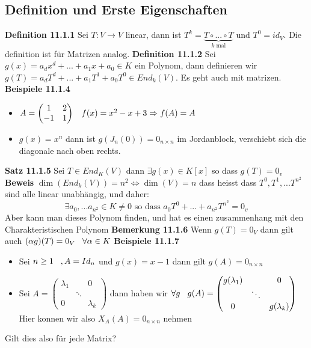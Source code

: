 \documentclass{article}
\newcommand{\smspc}{\hspace{0.3cm}}
\begin{document}
\subsection{Definition und Erste Eigenschaften}\textbf{Definition 11.1.1} Sei $T:V\rightarrow V$ linear, dann ist $T^k=\underset{k\text{ mal}}{\underbrace{T\circ...\circ T}}$ und $T^0=id_V$. Die definition ist für Matrizen analog.\newline
\textbf{Definition 11.1.2} Sei $g(x)=a_dx^d+...+a_1x+a_0\in K$ ein Polynom, dann definieren wir $g(T)=a_dT^d+...+a_1T^1+a_0T^0\in End_k(V)$. Es geht auch mit matrizen.
\newline\textbf{Beispiele 11.1.4}
\begin{itemize}
  \item{$A=\begin{pmatrix}1&2\\-1&1\end{pmatrix}\smspc f(x)=x^2-x+3\Rightarrow f(A)=A$}
  \item{$g(x)=x^n$ dann ist $g(J_n(0))=0_{n\times n}$ im Jordanblock, verschiebt sich die diagonale nach oben rechts.}
\end{itemize}
\textbf{Satz 11.1.5} Sei $T\in End_K(V)$ dann $\exists g(x)\in K[x]$ so dass $g(T)=0_v$
\newline\textbf{Beweis} $\dim(End_k(V))=n^2\Leftrightarrow\dim(V)=n$ dass heisst dass $T^0,T^1,...T^{n^2}$ sind alle linear unabhängig, und daher:\[\exists a_0,...a_{n^2}\in K \neq 0\text{ so dass }a_0T^0+...+a_{n^2}T^{n^2}=0_v\]
\newline Aber kann man dieses Polynom finden, und hat es einen zusammenhang mit den Charakteristischen Polynom\newline
\textbf{Bemerkung 11.1.6} Wenn $g(T)=0_V$ dann gilt auch $(\alpha g)(T)=0_V\smspc \forall \alpha \in K$
\newline\textbf{Beispiele 11.1.7}\begin{itemize}
  \item{Sei $n\ge1\smspc, A=Id_n$ und $g(x)=x-1$ dann gilt $g(A)=0_{n\times n}$}
  \item{Sei $A=\begin{pmatrix}\lambda_1&\left.\right.&0\\\left.\right.&\ddots&\left.\right.\\0&\left.\right.&\lambda_k\end{pmatrix}$ dann haben wir
    $\forall g\smspc g(A)=\begin{pmatrix}g(\lambda_1)&\left.\right.&0\\\left.\right.&\ddots&\left.\right.\\0&\left.\right.&g(\lambda_k)\end{pmatrix}$ Hier konnen wir also $X_A(A)=0_{n\times n}$ nehmen}
\end{itemize}
Gilt dies also für jede Matrix?
\end{document}
